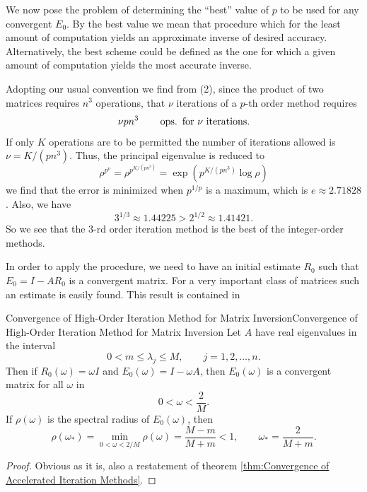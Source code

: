 \documentclass[../main.tex]{subfiles}
\begin{document}
We now pose the problem of determining the ``best'' value of $p$ to be used for any convergent $E_0$. By the best value we mean that procedure which for the least amount of computation yields an approximate inverse of desired accuracy. Alternatively, the best scheme could be defined as the one for which a given amount of computation yields the most accurate inverse.

Adopting our usual convention we find from (2), since the product of two matrices requires $n^3$ operations, that $\nu$ iterations of a $p$-th order method requires
\begin{equation*}
	\nu p n^3 \qquad \operatorname{ops.} \text{ for $\nu$ iterations.}
\end{equation*}
If only $K$ operations are to be permitted the number of iterations allowed is $\nu = K / (p n^3)$. Thus, the principal eigenvalue is reduced to
\begin{equation*}
	\rho^{p^{\nu}} = \rho^{p^{K / (p n^3)}} = \exp \left( p^{K / (p n^3)} \log \rho \right)
\end{equation*}
we find that the error is minimized when $p^{1/ p}$ is a maximum, which is $e \approx 2.71828$. Also, we have
\begin{equation*}
	3^{1/3} \approx 1.44225 > 2^{1/2} \approx 1.41421.
\end{equation*}
So we see that the $3$-rd order iteration method is the best of the integer-order methods.

In order to apply the procedure, we need to have an initial estimate $R_0$ such that $E_0 = I - A R_0$ is a convergent matrix. For a very important class of matrices such an estimate is easily found. This result is contained in

\begin{theorem}{Convergence of High-Order Iteration Method for Matrix Inversion}{Convergence of High-Order Iteration Method for Matrix Inversion}
	Let $A$ have real eigenvalues in the interval
	\begin{equation*}
		0 < m \leq \lambda_j \leq M, \qquad j = 1,2, \ldots ,n.
	\end{equation*}
	Then if $R_0(\omega) = \omega I$ and $E_0(\omega) = I - \omega A$, then $E_0(\omega)$ is a convergent matrix for all $\omega$ in
	\begin{equation}
		0 < \omega < \frac{2}{M}.
	\end{equation}
	If $\rho(\omega)$ is the spectral radius of $E_0(\omega)$, then
	\begin{equation}
		\rho(\omega_*) = \min_{0 < \omega < 2 / M} \rho(\omega) = \frac{M - m}{M + m} < 1, \qquad \omega_* = \frac{2}{M + m}.
	\end{equation}
\end{theorem}
\begin{proof}
	Obvious as it is, also a restatement of theorem \ref{thm:Convergence of Accelerated Iteration Methods}.
\end{proof}
\end{document}
